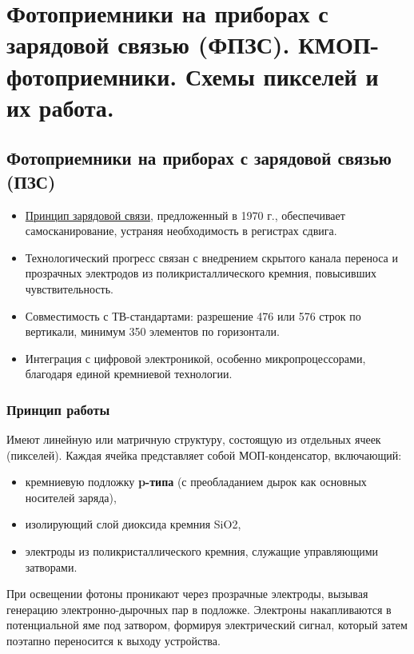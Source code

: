 	\newpage
	
	\section{Фотоприемники на приборах с зарядовой связью (ФПЗС). КМОП-фотоприемники. Схемы пикселей и их работа.}
	
	\subsection{Фотоприемники на приборах с зарядовой связью (ПЗС)}
	
	\begin{itemize}
		\item \uline {Принцип зарядовой связи}, предложенный в 1970 г., обеспечивает самосканирование, устраняя необходимость в регистрах сдвига.
		\item Технологический прогресс связан с внедрением скрытого канала переноса и прозрачных электродов из поликристаллического кремния, повысивших чувствительность.
		\item Совместимость с ТВ-стандартами: разрешение 476 или 576 строк по вертикали, минимум 350 элементов по горизонтали.
		\item Интеграция с цифровой электроникой, особенно микропроцессорами, благодаря единой кремниевой технологии.
	\end{itemize}
	
	\subsubsection{Принцип работы}
	Имеют линейную или матричную структуру, состоящую из отдельных ячеек (пикселей). 
	\newline
	Каждая ячейка представляет собой МОП-конденсатор, включающий:  
	\begin{itemize}
		\item кремниевую подложку \textbf{p-типа} (с преобладанием дырок как основных носителей заряда),
		\item изолирующий слой диоксида кремния SiO2,
		\item электроды из поликристаллического кремния, служащие управляющими затворами.
	\end{itemize}
	При освещении фотоны проникают через прозрачные электроды, вызывая генерацию электронно-дырочных пар в подложке. Электроны накапливаются в потенциальной яме под затвором, формируя электрический сигнал, который затем поэтапно переносится к выходу устройства.
	
